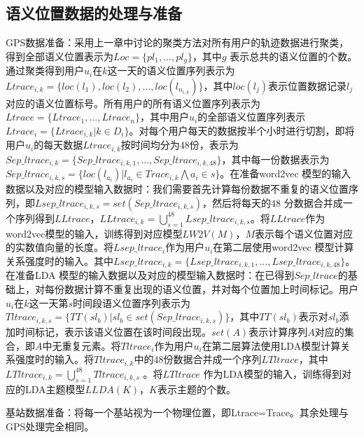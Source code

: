 \subsection{语义位置数据的处理与准备}
GPS数据准备：采用上一章中讨论的聚类方法对所有用户的轨迹数据进行聚类，得到全部语义位置表示为$Loc=\{pl_{1},...,pl_{g}\}$，其中$g$ 表示总共的语义位置的个数。通过聚类得到用户$u_{i}$在$k$这一天的语义位置序列表示为$Ltrace_{i,k}=\{loc(l_{1}),loc(l_{2}),...,loc(l_{n_{i,k}})\}$，其中$loc(l_{j})$表示位置数据记录$l_{j}$对应的语义位置标号。所有用户的所有语义位置序列表示为$Ltrace=\{Ltrace_{1},...,Ltrace_{n}\}$，其中用户$u_{i}$的全部语义位置序列表示$Ltrace_{i}=\{Ltrace_{i,k}|k\in D_{i}\}$。对每个用户每天的数据按半个小时进行切割，即将用户$u_{i}$的每天数据$Ltrace_{i,k}$按时间均分为$48$份，表示为$Sep\_ltrace_{i,k}=\{Sep\_ltrace_{i,k,1},...,Sep\_ltrace_{i,k,48}\}$，其中每一份数据表示为$Sep\_ltrace_{i,k,s}=\{loc(l_{a_{i}})|l_{a_{i}}\in Trace_{i,k}\bigwedge a_{i}\in s\}$。在准备word2vec 模型的输入数据以及对应的模型输入数据时：我们需要首先计算每份数据不重复的语义位置序列，即$Lsep\_ltrace_{i,k,s}=set(Sep\_ltrace_{i,k,s})$，然后将每天的$48$ 分数据合并成一个序列得到$LLtrace$，$LLtrace_{i,k}=\bigcup_{s=1}^{48}Lsep\_ltrace_{i,k,s}$。将$LLtrace$作为word2vec模型的输入，训练得到对应模型$LW2V(M)$，$M$表示每个语义位置对应的实数值向量的长度。将$Lsep\_ltrace_{i}$作为用户$u_{i}$在第二层使用word2vec 模型计算关系强度时的输入。其中$Lsep\_ltrace_{i,k}=\{Lsep\_ltrace_{i,k,1},...,Lsep\_ltrace_{i,k,48}\}$。在准备LDA 模型的输入数据以及对应的模型输入数据时：在已得到$Sep\_ltrace$的基础上，对每份数据计算不重复出现的语义位置，并对每个位置加上时间标记。用户$u_{i}$在$k$这一天第$s$时间段语义位置序列表示为$Tltrace_{i,k,s}=\{TT(sl_{b})|sl_b\in set(Sep\_ltrace_{i,k,s})\}$，其中$TT(sl_{b})$表示对$sl_{b}$添加时间标记，表示该语义位置在该时间段出现。$set(A)$表示计算序列$A$对应的集合，即$A$中无重复元素。将$Tltrace_{i}$作为用户$u_{i}$在第二层算法使用LDA模型计算关系强度时的输入。将$Tltrace_{i,k}$中的$48$份数据合并成一个序列$LTltrace$，其中$LTltrace_{i,k}=\bigcup_{s=1}^{48}Tltrace_{i,k,s}$ 。将$LTltrace$ 作为LDA模型的输入，训练得到对应的LDA主题模型$LLDA(K)$，$K$表示主题的个数。
\par 基站数据准备：将每一个基站视为一个物理位置，即Ltrace=Trace。其余处理与GPS处理完全相同。

